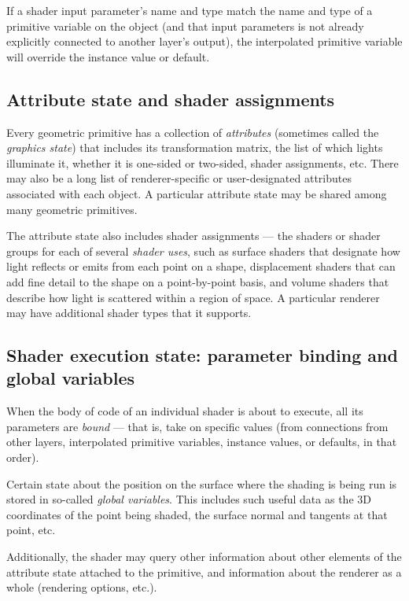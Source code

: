 \documentclass[11pt,letterpaper]{book}
\begin{document}
If a shader input parameter's name and type match the name and type
of a primitive variable on the object (and that input parameters is
not already explicitly connected to another layer's output), the
interpolated primitive variable will override the instance value or
default.


\subsection*{Attribute state and shader assignments}

Every geometric primitive has a collection of \emph{attributes} (sometimes
called the \emph{graphics state}) that includes its transformation
matrix, the list of which lights illuminate it, whether it is one-sided
or two-sided, shader assignments, etc.  There may also be a long list of
renderer-specific or user-designated attributes associated with each
object.  A particular attribute state may be shared among many geometric
primitives.

The attribute state also includes shader assignments --- the shaders or
shader groups for each of several \emph{shader uses}, such as surface
shaders that designate how light reflects or emits from each point on a shape,
displacement shaders that can add fine detail to the shape on a
point-by-point basis, and volume shaders that describe how light is
scattered within a region of space.  A particular renderer may have
additional shader types that it supports.


\subsection*{Shader execution state: parameter binding and global variables}

When the body of code of an individual shader is about to execute, all
its parameters are \emph{bound} --- that is, take on specific values
(from connections from other layers, interpolated primitive variables,
instance values, or defaults, in that order).

Certain state about the position on the surface where the shading is
being run is stored in so-called \emph{global variables}.  This includes
such useful data as the 3D coordinates of the point being shaded, the
surface normal and tangents at that point, etc.

Additionally, the shader may query other information about other
elements of the attribute state attached to the primitive, and
information about the renderer as a whole (rendering options, etc.).
\end{document}

